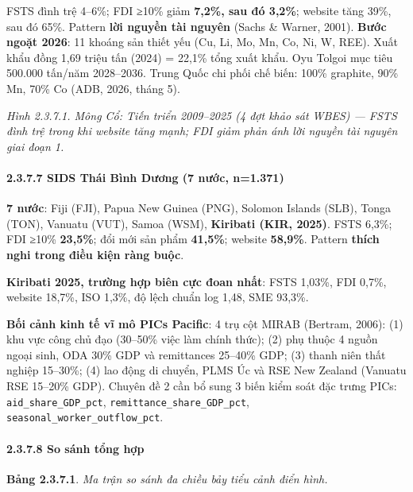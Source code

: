 \documentclass[12pt,a4paper]{article}
\begin{document}
FSTS đình trệ 4--6\%; FDI ≥10\% giảm \textbf{7,2\%, sau đó 3,2\%};
website tăng 39\%, sau đó 65\%. Pattern \textbf{lời nguyền tài nguyên}
(Sachs \& Warner, 2001). \textbf{Bước ngoặt 2026}: 11 khoáng sản thiết
yếu (Cu, Li, Mo, Mn, Co, Ni, W, REE). Xuất khẩu đồng 1,69 triệu tấn
(2024) = 22,1\% tổng xuất khẩu. Oyu Tolgoi mục tiêu 500.000 tấn/năm
2028--2036. Trung Quốc chi phối chế biến: 100\% graphite, 90\% Mn, 70\%
Co (ADB, 2026, tháng 5).

\emph{Hình 2.3.7.1. Mông Cổ: Tiến triển 2009--2025 (4 đợt khảo sát WBES)
--- FSTS đình trệ trong khi website tăng mạnh; FDI giảm phản ánh lời
nguyền tài nguyên giai đoạn 1.}

\hypertarget{2377-sids-thuxe1i-buxecnh-dux1b0ux1a1ng-7-nux1b0ux1edbc-n1371}{%
\paragraph{2.3.7.7 SIDS Thái Bình Dương (7 nước,
n=1.371)}\label{2377-sids-thuxe1i-buxecnh-dux1b0ux1a1ng-7-nux1b0ux1edbc-n1371}}

\textbf{7 nước}: Fiji (FJI), Papua New Guinea (PNG), Solomon Islands
(SLB), Tonga (TON), Vanuatu (VUT), Samoa (WSM), \textbf{Kiribati (KIR,
2025)}. FSTS 6,3\%; FDI ≥10\% \textbf{23,5\%}; đổi mới sản phẩm
\textbf{41,5\%}; website \textbf{58,9\%}. Pattern \textbf{thích nghi
trong điều kiện ràng buộc}.

\textbf{Kiribati 2025, trường hợp biên cực đoan nhất}: FSTS 1,03\%, FDI
0,7\%, website 18,7\%, ISO 1,3\%, độ lệch chuẩn log 1,48, SME 93,3\%.

\textbf{Bối cảnh kinh tế vĩ mô PICs Pacific}: 4 trụ cột MIRAB (Bertram,
2006): (1) khu vực công chủ đạo (30--50\% việc làm chính thức); (2) phụ
thuộc 4 nguồn ngoại sinh, ODA 30\% GDP và remittances 25--40\% GDP; (3)
thanh niên thất nghiệp 15--30\%; (4) lao động di chuyển, PLMS Úc và RSE
New Zealand (Vanuatu RSE 15--20\% GDP). Chuyên đề 2 cần bổ sung 3 biến
kiểm soát đặc trưng PICs: \texttt{aid\_share\_GDP\_pct},
\texttt{remittance\_share\_GDP\_pct},
\texttt{seasonal\_worker\_outflow\_pct}.

\hypertarget{2378-so-suxe1nh-tux1ed5ng-hux1ee3p}{%
\paragraph{2.3.7.8 So sánh tổng
hợp}\label{2378-so-suxe1nh-tux1ed5ng-hux1ee3p}}

\textbf{Bảng 2.3.7.1}. \emph{Ma trận so sánh đa chiều bảy tiểu cảnh điển
hình.}
\end{document}
